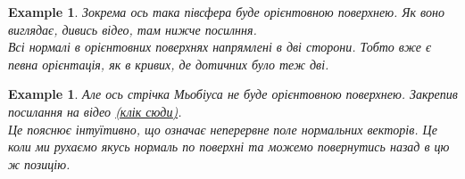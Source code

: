 \documentclass[a4paper, 10pt]{article}
\theoremstyle{theoremdd}
\theoremstyle{theoremdd}
\theoremstyle{theoremdd}
\theoremstyle{theoremdd}
\newtheorem{example}[theorem]{Example}
\theoremstyle{theoremdd}
\theoremstyle{theoremdd}
\theoremstyle{theoremdd}
\theoremstyle{theoremdd}
\begin{document}
\begin{example}
Зокрема ось така півсфера буде орієнтовною поверхнею. Як воно виглядає, дивись відео, там нижче посилння.\\
Всі нормалі в орієнтовних поверхнях напрямлені в дві сторони. Тобто вже є певна орієнтація, як в кривих, де дотичних було теж дві.
\end{example}

\begin{example}
Але ось стрічка Мьобіуса не буде орієнтовною поверхнею. Закрепив посилання на відео \href{https://www.youtube.com/watch?v=S48JsV-pCBo}{(клік сюди)}.\\
Це пояснює інтуїтивно, що означає неперервне поле нормальних векторів. Це коли ми рухаємо якусь нормаль по поверхні та можемо повернутись назад в цю ж позицію.
\end{example}
\end{document}
